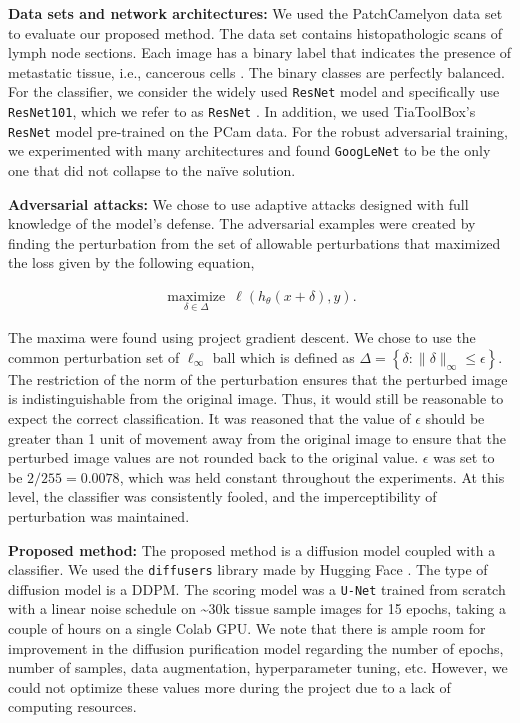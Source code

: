 \textbf{Data sets and network architectures:} We used the PatchCamelyon data set to evaluate our proposed method. The data set contains histopathologic scans of lymph node sections. Each image has a binary label that indicates the presence of metastatic tissue, i.e., cancerous cells \cite{Pocock2022}. The binary classes are perfectly balanced. For the classifier, we consider the widely used \texttt{ResNet} model and specifically use \texttt{ResNet101}, which we refer to as \texttt{ResNet} \cite{ResNet}. In addition, we used TiaToolBox's \texttt{ResNet} model pre-trained on the PCam data. For the robust adversarial training, we experimented with many architectures and found \texttt{GoogLeNet}\cite{szegedy2015going} to be the only one that did not collapse to the naïve solution.

\textbf{Adversarial attacks:}
We chose to use adaptive attacks designed with full knowledge of the model's defense. The adversarial examples were created by finding the perturbation from the set of allowable perturbations that maximized the loss given by the following equation,

\begin{align}
    \underset{\delta \in \Delta}{\operatorname{maximize}} \: \ell\left(h_\theta(x+\delta), y\right).
\end{align}

The maxima were found using project gradient descent. We chose to use the common perturbation set of $\ell_{\infty}$ ball which is defined as $\Delta=\left\{\delta:\|\delta\|_{\infty} \leq \epsilon\right\}$. The restriction of the norm of the perturbation ensures that the perturbed image is indistinguishable from the original image. Thus, it would still be reasonable to expect the correct classification. It was reasoned that the value of $\epsilon$ should be greater than 1 unit of movement away from the original image to ensure that the perturbed image values are not rounded back to the original value. $\epsilon$ was set to be $2/255 = 0.0078$, which was held constant throughout the experiments. At this level, the classifier was consistently fooled, and the imperceptibility of perturbation was maintained. 

\textbf{Proposed method:}
The proposed method is a diffusion model coupled with a classifier. We used the \texttt{diffusers} library made by Hugging Face \cite{von-platen-etal-2022-diffusers}. The type of diffusion model is a DDPM. The scoring model was a \texttt{U-Net} trained from scratch with a linear noise schedule on \textasciitilde 30k tissue sample images for 15 epochs, taking a couple of hours on a single Colab GPU. We note that there is ample room for improvement in the diffusion purification model regarding the number of epochs, number of samples, data augmentation, hyperparameter tuning, etc. However, we could not optimize these values more during the project due to a lack of computing resources.


